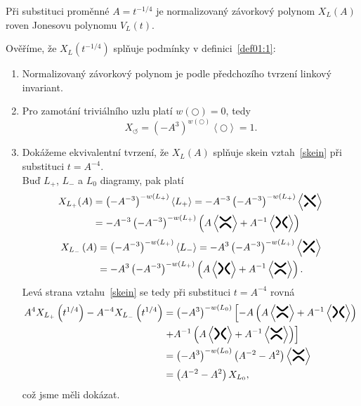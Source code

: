 \begin{tvrz}\label{t01:6}
Při substituci proměnné $A = t^{-1/4}$ je normalizovaný závorkový polynom $X_L(A)$  roven Jonesovu polynomu $V_L(t)$.
\end{tvrz}
\begin{dukaz}
Ověříme, že $X_L\left(t^{-1/4}\right)$ splňuje podmínky v definici~\ref{def01:1}:

\begin{enumerate}
\item
Normalizovaný závorkový polynom je podle předchozího tvrzení linkový invariant.
\item
Pro zamotání triviálního uzlu platí $w\left( \pmb{\bigcirc}\right) = 0$, tedy $$X_{\pmb{\circlearrowleft}} = \left(-A^3\right)^{w( \pmb{\bigcirc})} \left\langle \pmb{\bigcirc} \right\rangle = 1.$$ 
\item
Dokážeme ekvivalentní tvrzení, že $X_L(A)$ splňuje skein vztah~\ref{skein} při substituci $t=A^{-4}$. \\ Buď $L_+$, $ L_-$ a $L_0$ diagramy, pak platí
\begin{equation*}
\begin{split}
X_{L_+}(A) & = \left(-A^{-3}\right)^{-w(L_+)} \left\langle L_+  \right\rangle = -A^{-3} \left(-A^{-3}\right)^{-w(L_+)}  \left\langle \minuskriz   \right\rangle \\ & = -A^{-3} \left(-A^{-3}\right)^{-w(L_+)} \left(A \left\langle \horkriz  \right\rangle + A^{-1}  \left\langle \vertkriz  \right\rangle\right)
\end{split}
\end{equation*}
\begin{equation*}
\begin{split}
X_{L_-}\left(A\right) & =\left(-A^{-3}\right)^{-w(L_+)} \left\langle L_-  \right\rangle = -A^{3}\left(-A^{-3}\right)^{-w(L_+)} \left\langle \pluskriz   \right\rangle \\ & = -A^{3} \left(-A^{-3}\right)^{-w(L_+)} \left(A \left\langle \vertkriz  \right\rangle + A^{-1}  \left\langle \horkriz  \right\rangle\right) .
\end{split}
\end{equation*}
Levá strana vztahu~\ref{skein} se tedy při substituci $t=A^{-4}$ rovná
\begin{equation*}
\begin{split}
A^4 X_{L_+}\left(t^{1/4}\right)  - A^{-4} X_{L_-} \left(t^{1/4}\right) &  =  \left(-A^3\right)^{-w(L_0)} \left[ -A  \left(A \left\langle \horkriz \right\rangle + A^{-1}  \left\langle \vertkriz \right\rangle \right) \right. \\ & \left. + A^{-1} \left(A \left\langle \vertkriz \right\rangle + A^{-1}  \left\langle \horkriz \right\rangle\right) \right] \\ & = \left(-A^3\right)^{-w(L_0)} \left(A^{-2} -A^2\right) \left\langle \horkriz \right\rangle \\ & =  \left(A^{-2} -A^2\right) X_{L_0},
\end{split}
\end{equation*}
což jsme měli dokázat.
\end{enumerate}
$ $
\end{dukaz}
